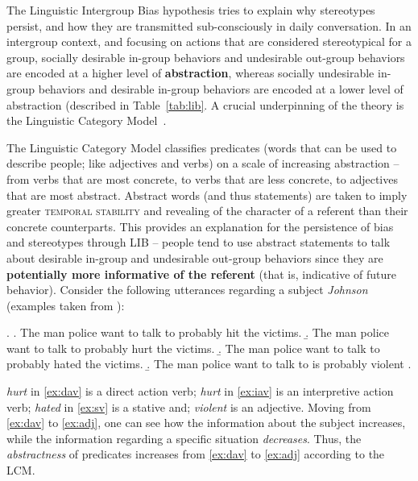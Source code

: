 The Linguistic Intergroup Bias hypothesis tries to explain why stereotypes persist, and how they are transmitted sub-consciously in daily conversation. In an intergroup context, and focusing on actions that are considered stereotypical for a group, socially desirable in-group behaviors and undesirable out-group behaviors are encoded at a higher level of \textbf{abstraction}, whereas socially undesirable in-group behaviors and desirable in-group behaviors are encoded at a lower level of abstraction (described in Table~\ref{tab:lib}. A crucial underpinning of the theory is the Linguistic Category Model~\citep{semin_cognitive_1988}.



The Linguistic Category Model classifies predicates (words that can be used to describe people; like adjectives and verbs) on a scale of increasing abstraction -- from verbs that are most concrete, to verbs that are less concrete, to adjectives that are most abstract. Abstract words (and thus statements) are taken to imply greater {\scshape temporal stability} and revealing of the character of a referent than their concrete counterparts. This provides an explanation for the persistence of bias and stereotypes through LIB -- people tend to use abstract statements to talk about desirable in-group and undesirable out-group behaviors since they are \textbf{potentially more informative of the referent} (that is, indicative of future behavior). Consider the following utterances regarding a subject \textit{Johnson} (examples taken from \citet{gorham_news_2006}):

\ex. \label{ex:exs} \a. The man police want to talk to probably hit the victims.\label{ex:dav}
     \b. The man police want to talk to probably hurt the victims.\label{ex:iav}
     \b. The man police want to talk to probably hated the victims.\label{ex:sv}
     \b. The man police want to talk to is probably violent .\label{ex:adj}
     
\textit{hurt} in \ref{ex:dav} is a direct action verb; \textit{hurt} in \ref{ex:iav} is an interpretive action verb; \textit{hated} in \ref{ex:sv} is a stative and; \textit{violent} is an adjective. Moving from \ref{ex:dav} to \ref{ex:adj}, one can see how the information about the subject increases, while the information regarding a specific situation \textit{decreases}. Thus, the \emph{abstractness} of predicates increases from \ref{ex:dav} to \ref{ex:adj} according to the LCM.

